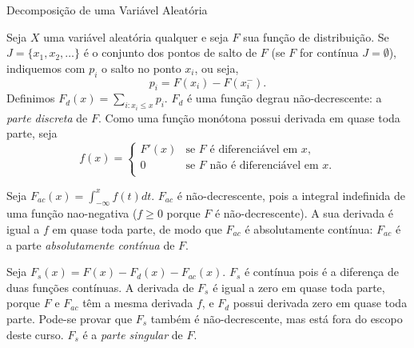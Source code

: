 \begin{frame}
\begin{block}{Decomposição de uma Variável Aleatória}

Seja $X$ uma variável aleatória qualquer e seja $F$ sua função de distribuição. Se $J=\{x_1,x_2,\ldots\}$ é o conjunto dos pontos de salto de $F$ (se $F$ for contínua $J=\emptyset$), indiquemos com $p_i$ o salto no ponto $x_i$, ou seja,
$$p_i=F(x_i)-F(x_i^-).$$
Definimos $F_d(x)=\sum_{i:x_i\leq x}p_i.$ $F_d$ é uma função degrau não-decrescente: a {\em parte discreta} de $F$. Como uma função monótona possui derivada em quase toda parte, seja
%
\[
f(x)= \left\{
\begin{array}{ll}
F'(x) & \mbox{se $F$ é diferenciável em $x$,} \\
0 & \mbox{se $F$ não é diferenciável em $x$.}\\
\end{array}
\right.
\]

\bigskip
Seja $F_{ac}(x)=\int_{-\infty}^{x}f(t)dt$. $F_{ac}$ é não-decrescente, pois a integral indefinida de uma função nao-negativa ($f\geq 0$ porque $F$ é não-decrescente). A sua derivada é igual a $f$ em quase toda parte, de modo que $F_{ac}$ é absolutamente contínua: $F_{ac}$ é a parte {\em absolutamente contínua} de $F$.

Seja $F_s(x)=F(x)-F_d(x)-F_{ac}(x)$. $F_s$ é contínua pois é a diferença de duas funções contínuas. A derivada de $F_s$ é igual a zero em quase toda parte, porque $F$ e $F_{ac}$ têm a mesma derivada $f$, e $F_d$ possui derivada zero em quase toda parte. Pode-se provar que $F_s$ também é não-decrescente, mas está fora do escopo deste curso. $F_s$ é a {\em parte singular} de $F$.
\end{block}


\end{frame}


